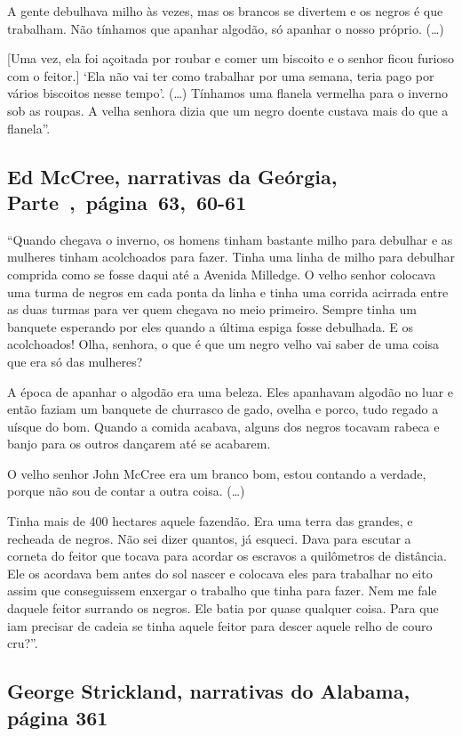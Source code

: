 A gente debulhava milho às vezes, mas os brancos se divertem e os negros
é que trabalham. Não tínhamos que apanhar algodão, só apanhar o nosso
próprio. (\ldots{})

{[}Uma vez, ela foi açoitada por roubar e comer um biscoito e o senhor
ficou furioso com o feitor.{]} `Ela não vai ter como trabalhar por uma
semana, teria pago por vários biscoitos nesse tempo'. (\ldots{})
Tínhamos uma flanela vermelha para o inverno sob as roupas. A velha
senhora dizia que um negro doente custava mais do que a flanela''.

\subsection{Ed McCree, narrativas da Geórgia, Parte~,~página~63,~60-61}
\label{ref186}

``Quando chegava o inverno, os homens tinham bastante milho para
debulhar e as mulheres tinham acolchoados para fazer. Tinha uma linha de
milho para debulhar comprida como se fosse daqui até a Avenida Milledge.
O velho senhor colocava uma turma de negros em cada ponta da linha e
tinha uma corrida acirrada entre as duas turmas para ver quem chegava no
meio primeiro. Sempre tinha um banquete esperando por eles quando a
última espiga fosse debulhada. E os acolchoados! Olha, senhora, o que é
que um negro velho vai saber de uma coisa que era só das mulheres?

A época de apanhar o algodão era uma beleza. Eles apanhavam algodão no
luar e então faziam um banquete de churrasco de gado, ovelha e porco,
tudo regado a uísque do bom. Quando a comida acabava, alguns dos negros
tocavam rabeca e banjo para os outros dançarem até se acabarem.

O velho senhor John McCree era um branco bom, estou contando
a verdade, porque não sou de contar a outra coisa. (\ldots{})

Tinha mais de 400 hectares aquele fazendão. Era uma terra das grandes, e
recheada de negros. Não sei dizer quantos, já esqueci. Dava para escutar
a corneta do feitor que tocava para acordar os escravos a quilômetros de
distância. Ele os acordava bem antes do sol nascer e colocava eles para
trabalhar no eito assim que conseguissem enxergar o trabalho que tinha
para fazer. Nem me fale daquele feitor surrando os negros. Ele batia por
quase qualquer coisa. Para que iam precisar de cadeia se tinha aquele
feitor para descer aquele relho de couro cru?''.

\subsection{George Strickland, narrativas do Alabama, página 361}
\label{ref256} 

